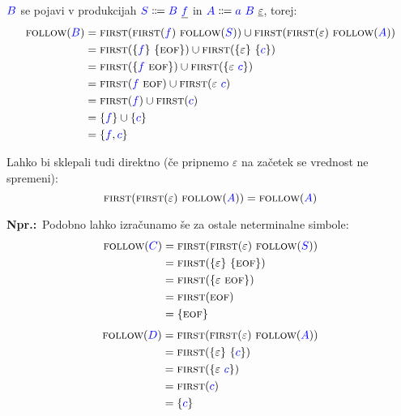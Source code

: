 \documentclass{article}
\newcommand{\Ex}{\textbf{Npr.:}\ }
\newcommand{\FIRST}{\textsc{first}}
\newcommand{\FOLLOW}{\textsc{follow}}
\newcommand{\EOF}{\textsc{eof}}
\newcommand{\Symbol}[1]{\textcolor{blue}{#1}}
\newcommand{\Null}{\varepsilon}
\newcommand{\Arrow}{\Coloneq}
\newcommand{\Seq}{\ }
\begin{document}
$\Symbol{B}$ se pojavi v produkcijah $\Symbol{S} \Arrow \Symbol{B} \Seq \underline{\Symbol{f}}$ in $\Symbol{A} \Arrow \Symbol{a} \Seq \Symbol{B} \Seq \underline{\Null}$, torej:
\begin{align*}
  \FOLLOW(\Symbol{B}) &= \FIRST(\FIRST(\Symbol{f}) \Seq \FOLLOW(\Symbol{S})) \cup \FIRST(\FIRST(\Null) \Seq \FOLLOW(\Symbol{A})) \\
             &= \FIRST(\{\Symbol{f}\} \Seq \{\EOF\}) \cup \FIRST(\{\Null\} \Seq \{\Symbol{c}\}) \\
             &= \FIRST(\{\Symbol{f} \Seq \EOF\}) \cup \FIRST(\{\Null \Seq \Symbol{c}\}) \\
             &= \FIRST(\Symbol{f} \Seq \EOF) \cup \FIRST(\Null \Seq \Symbol{c}) \\
             &= \FIRST(\Symbol{f}) \cup \FIRST(\Symbol{c})\\
             &= \{\Symbol{f}\} \cup \{\Symbol{c}\}\\
             &= \{\Symbol{f}, \Symbol{c}\}
\end{align*}

Lahko bi sklepali tudi direktno (če pripnemo $\Null$ na začetek se vrednost ne spremeni):
\begin{equation*}
  \FIRST(\FIRST(\Null) \Seq \FOLLOW(\Symbol{A})) = \FOLLOW(\Symbol{A})
\end{equation*}

\Ex Podobno lahko izračunamo še za ostale neterminalne simbole:
\begin{align*}
  \FOLLOW(\Symbol{C}) &= \FIRST(\FIRST(\Null) \Seq \FOLLOW(\Symbol{S})) \\
             &= \FIRST(\{\Null\} \Seq \{\EOF\})\\
             &= \FIRST(\{\Null \Seq \EOF\})\\
             &= \FIRST(\EOF) \\
             &= \{\EOF\}
\end{align*}
\begin{align*}
  \FOLLOW(\Symbol{D}) &= \FIRST(\FIRST(\Null) \Seq \FOLLOW(\Symbol{A})) \\
             &= \FIRST(\{\Null\} \Seq \{\Symbol{c}\})\\
             &= \FIRST(\{\Null \Seq \Symbol{c}\})\\
             &= \FIRST(\Symbol{c}) \\
             &= \{\Symbol{c}\}
\end{align*}
\end{document}
